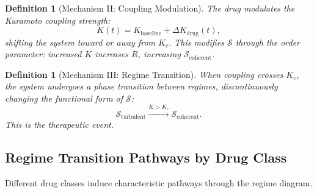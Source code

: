 \documentclass[twocolumn,10pt]{article}
\newtheorem{definition}[theorem]{Definition}
\theoremstyle{remark}
\newcommand{\Rorder}{R}
\begin{document}
\begin{definition}[Mechanism II: Coupling Modulation]
\label{def:mech_coupling}
The drug modulates the Kuramoto coupling strength:
\begin{equation}
  K(t) = K_{\mathrm{baseline}} + \Delta K_{\mathrm{drug}}(t),
\end{equation}
shifting the system toward or away from $K_c$. This modifies $\mathcal{S}$ through the order parameter: increased $K$ increases $\Rorder$, increasing $\mathcal{S}_{\mathrm{coherent}}$.
\end{definition}

\begin{definition}[Mechanism III: Regime Transition]
\label{def:mech_regime}
When coupling crosses $K_c$, the system undergoes a phase transition between regimes, discontinuously changing the functional form of $\mathcal{S}$:
\begin{equation}
  \mathcal{S}_{\mathrm{turbulent}} \xrightarrow{K > K_c} \mathcal{S}_{\mathrm{coherent}}.
\end{equation}
This is the therapeutic event.
\end{definition}

\subsection{Regime Transition Pathways by Drug Class}

Different drug classes induce characteristic pathways through the regime diagram.
\end{document}
